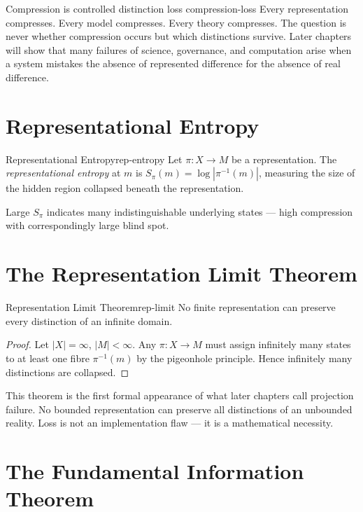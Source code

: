 \documentclass[12pt,twoside,openright]{book}
\begin{document}
\begin{remark}{Compression is controlled distinction loss}%
  {compression-loss}
  Every representation compresses. Every model compresses.
  Every theory compresses. The question is never whether
  compression occurs but which distinctions survive.
  Later chapters will show that many failures of science,
  governance, and computation arise when a system mistakes
  the absence of represented difference for the absence
  of real difference.
\end{remark}

\section{Representational Entropy}
\label{sec:ch2-rep}

\begin{definition}{Representational Entropy}{rep-entropy}
  Let $\pi: X \to M$ be a representation. The
  \emph{representational entropy} at $m$ is
  $S_\pi(m) = \log|\pi^{-1}(m)|$,
  measuring the size of the hidden region collapsed
  beneath the representation.
\end{definition}

Large $S_\pi$ indicates many indistinguishable underlying
states — high compression with correspondingly large
blind spot.

\section{The Representation Limit Theorem}
\label{sec:ch2-limit}

\begin{theorem}{Representation Limit Theorem}{rep-limit}
  No finite representation can preserve every distinction
  of an infinite domain.
\end{theorem}

\begin{proof}
  Let $|X| = \infty$, $|M| < \infty$. Any $\pi: X \to M$
  must assign infinitely many states to at least one
  fibre $\pi^{-1}(m)$ by the pigeonhole principle.
  Hence infinitely many distinctions are collapsed.
\end{proof}

This theorem is the first formal appearance of what
later chapters call projection failure. No bounded
representation can preserve all distinctions of an
unbounded reality. Loss is not an implementation flaw
— it is a mathematical necessity.

\section{The Fundamental Information Theorem}
\label{sec:ch2-fund}
\end{document}
